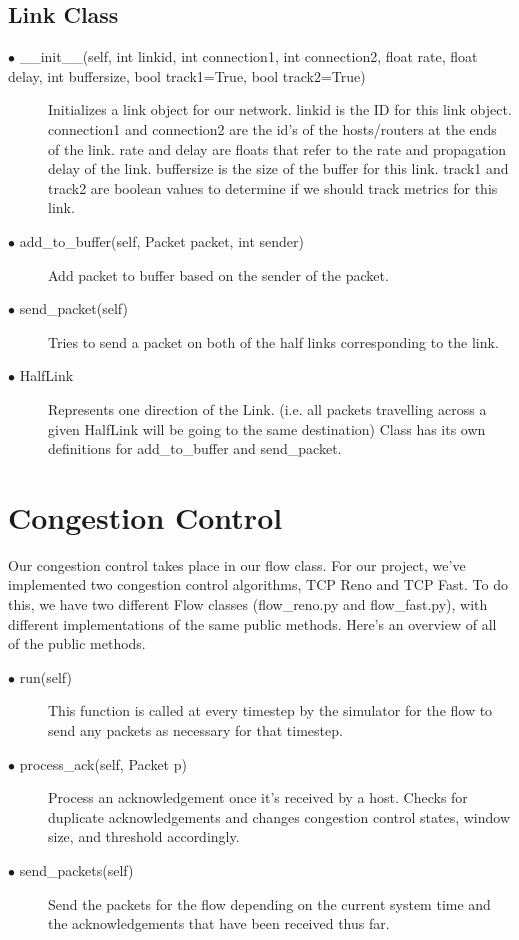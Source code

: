 \documentclass{article}
\begin{document}
\subsection{Link Class}
\begin{description}
	\item [$\bullet$ \_\_init\_\_(self, int linkid, int connection1, int connection2, float rate, float delay, int buffersize, bool track1=True, bool track2=True)] Initializes a link object for our network. linkid is the ID for this link object. connection1 and connection2 are the id's of the hosts/routers at the ends of the link. rate and delay are floats that refer to the rate and propagation delay of the link. buffersize is the size of the buffer for this link. track1 and track2 are boolean values to determine if we should track metrics for this link. 
	\item [$\bullet$ add\_to\_buffer(self, Packet packet, int sender)] Add packet to buffer based on the sender of the packet.
	\item [$\bullet$ send\_packet(self)] Tries to send a packet on both of the half links corresponding to the link.
	\item [$\bullet$ HalfLink] Represents one direction of the Link. (i.e. all packets travelling across a given HalfLink will be going to the same destination) Class has its own definitions for add\_to\_buffer and send\_packet.
	
\end{description}

\section{Congestion Control}

Our congestion control takes place in our flow class. For our project, we've implemented two congestion control algorithms, TCP Reno and TCP Fast. To do this, we have two different Flow classes (flow\_reno.py and flow\_fast.py), with different implementations of the same public methods. Here's an overview of all of the public methods. 

\begin{description}
	\item [$\bullet$ run(self)] This function is called at every timestep by the simulator for the flow to send any packets as necessary for that timestep.
	\item [$\bullet$ process\_ack(self, Packet p)] Process an acknowledgement once it's received by a host. Checks for duplicate acknowledgements and changes congestion control states, window size, and threshold accordingly.
	\item [$\bullet$ send\_packets(self)] Send the packets for the flow depending on the current system time and the acknowledgements that have been received thus far.
\end{description}
\end{document}
